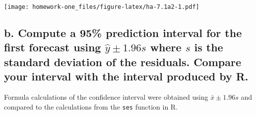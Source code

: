 \documentclass[openany]{book}
\begin{document}
\texttt{[image: homework-one\_files/figure-latex/ha-7.1a2-1.pdf]}

\hypertarget{b.-compute-a-95-prediction-interval-for-the-first-forecast-using-hatypm1.96s-where-s-is-the-standard-deviation-of-the-residuals.-compare-your-interval-with-the-interval-produced-by-r.}{%
\subsection{\texorpdfstring{b. Compute a 95\% prediction interval for the first forecast using \(\hat{y}\pm1.96s\) where \(s\) is the standard deviation of the residuals. Compare your interval with the interval produced by R.}{b. Compute a 95\% prediction interval for the first forecast using \textbackslash{}hat\{y\}\textbackslash{}pm1.96s where s is the standard deviation of the residuals. Compare your interval with the interval produced by R.}}\label{b.-compute-a-95-prediction-interval-for-the-first-forecast-using-hatypm1.96s-where-s-is-the-standard-deviation-of-the-residuals.-compare-your-interval-with-the-interval-produced-by-r.}}

Formula calculations of the confidence interval were obtained using \(\bar{x} \pm 1.96s\) and compared to the calculations from the \texttt{ses} function in R.
\end{document}
